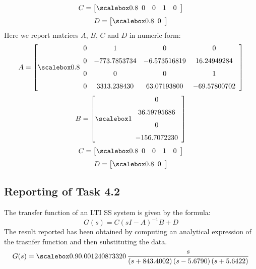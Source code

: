 \documentclass[11pt]{article}
\begin{document}
\medskip
\medskip
\medskip
\begin{equation*}
C = \left[ \scalemath{0.8}{\begin {array}{cccc} 0&0&1&0\end {array}} \right] 
\end{equation*}
\medskip
\medskip
\begin{equation*}
D = \left[ \scalemath{0.8}{\begin {array}{c} 0 \end {array}} \right] 
\end{equation*}
Here we report matrices $A$, $B$, $C$ and $D$ in numeric form:
\begin{equation*}
A =  \left[ \scalemath{0.8}{\begin {array}{cccc} 0&1&0&0\\ \noalign{\medskip}0&-
 773.7853734&- 6.573516819& 16.24949284\\ \noalign{\medskip}0&0&0&1
\\ \noalign{\medskip}0& 3313.238430& 63.07193800&- 69.57800702
\end {array}} \right] 
\end{equation*}
\begin{equation*}
B =  \left[ \scalemath{1}{\begin {array}{c} 0\\ \noalign{\medskip} 36.59795686
\\ \noalign{\medskip}0\\ \noalign{\medskip}- 156.7072230\end {array}}
 \right] 
\end{equation*}
\medskip
\medskip
\medskip
\begin{equation*}
C = \left[ \scalemath{0.8}{\begin {array}{cccc} 0&0&1&0\end {array}} \right] 
\end{equation*}
\medskip
\medskip
\begin{equation*}
D = \left[ \scalemath{0.8}{\begin {array}{c} 0 \end {array}} \right] 
\end{equation*}

\subsection*{Reporting of Task 4.2}
The transfer function of an LTI SS system is given by the formula:
\begin{equation*}
	G(s) = C(sI - A)^{-1}B + D
\end{equation*}
The result reported has been obtained by computing an analytical expression of the trasnfer function and then substituting the data. 
\begin{align*}
	G(s) = \scalemath{0.9}{0.001240873320\,{\frac {s}{ \left( s+ 843.4002 \right)  \left( s-
 5.6790 \right)  \left( s+ 5.6422 \right) }}
}
\end{align*}
\end{document}
